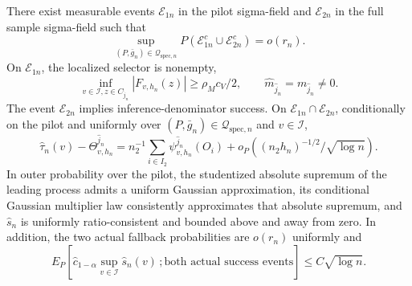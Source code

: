 There exist measurable events \(\mathcal E_{1n}\) in the pilot sigma-field and \(\mathcal E_{2n}\) in the full sample sigma-field such that
\[
 \sup_{(P,\bar g_n)\in\mathcal Q_{\mathrm{spec},n}}
 P(\mathcal E_{1n}^c\cup\mathcal E_{2n}^c)=o(r_n).
\]
On \(\mathcal E_{1n}\), the localized selector is nonempty,
\[
 \inf_{v\in\mathcal I,z\in C_{\widehat j_n}}|F_{v,h_n}(z)|
 \ge\rho_Mc_V/2,
 \qquad
 \widehat m_{\widehat j_n}=m_{\widehat j_n}\ne0.
\]
The event \(\mathcal E_{2n}\) implies inference-denominator success. On \(\mathcal E_{1n}\cap\mathcal E_{2n}\), conditionally on the pilot and uniformly over \((P,\bar g_n)\in\mathcal Q_{\mathrm{spec},n}\) and \(v\in\mathcal I\),
\[
 \widehat\tau_n(v)-\Theta^{\widehat j_n}_{v,h_n}
 =n_2^{-1}\sum_{i\in I_2}\psi^{\widehat j_n}_{v,h_n}(O_i)
 +o_P\!\left((n_2h_n)^{-1/2}/\sqrt{\log n}\right).
\]
In outer probability over the pilot, the studentized absolute supremum of the leading process admits a uniform Gaussian approximation, its conditional Gaussian multiplier law consistently approximates that absolute supremum, and \(\widehat s_n\) is uniformly ratio-consistent and bounded above and away from zero. In addition, the two actual fallback probabilities are \(o(r_n)\) uniformly and
\[
 E_P\!\left[\widehat c_{1-\alpha}\sup_{v\in\mathcal I}\widehat s_n(v)\,; \text{both actual success events}\right]\le C\sqrt{\log n}.
\]